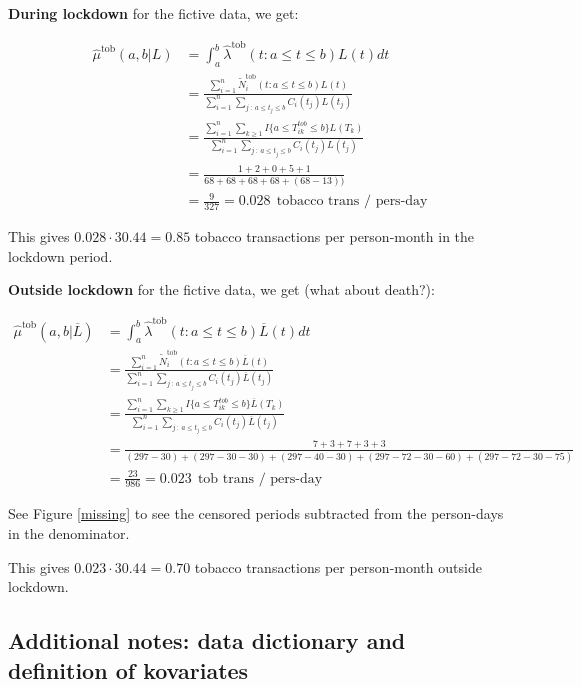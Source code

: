 \documentclass[
  11pt,
]{article}
\begin{document}
\textbf{During lockdown} for the fictive data, we get:

\begin{align*}
\hat{\mu}^{\text{tob}}(a, b | L) &= \int_a^b \hat{\lambda}^{\text{tob}} (t: a \leq t \leq b) L(t) dt \\
&=\frac{\sum_{i=1}^n \tilde{N}_i^{\text{tob}} (t: a \leq t \leq b) L(t)}{\sum_{i=1}^n \sum_{j \ : \ a \leq t_j \leq b} C_i(t_j) L(t_j)} \\
&=\frac{\sum_{i=1}^n \sum_{k \geq 1} I \{a \leq T^{tob}_{ik} \leq b\} L(T_k)}{\sum_{i=1}^n \sum_{j \ : \ a \leq t_j \leq b} C_i(t_j) L(t_j)} \\
&=\frac{1+2+0+5+1}{68+68+68+68+(68-13))} \\
&=\frac{9}{327} = 0.028 \ \ \text{tobacco trans / pers-day}
\end{align*}

This gives \(0.028 \cdot 30.44 = 0.85\) tobacco transactions per
person-month in the lockdown period.

\textbf{Outside lockdown} for the fictive data, we get (what about
death?):

\begin{align*}
\hat{\mu}^{\text{tob}}(a, b | \overline{L}) &= \int_a^b \hat{\lambda}^{\text{tob}} (t: a \leq t \leq b) \overline{L}(t) dt \\
&=\frac{\sum_{i=1}^n \tilde{N}_i^{\text{tob}} (t: a \leq t \leq b) \overline{L}(t)}{\sum_{i=1}^n \sum_{j \ : \ a \leq t_j \leq b} C_i(t_j) \overline{L}(t_j)} \\
&=\frac{\sum_{i=1}^n \sum_{k \geq 1} I \{a \leq T^{tob}_{ik} \leq b\} \overline{L}(T_k)}{\sum_{i=1}^n \sum_{j \ : \ a \leq t_j \leq b} C_i(t_j) \overline{L}(t_j)} \\
&=\frac{7+3+7+3+3}{(297-30)+(297-30-30)+(297-40-30)+(297-72-30-60)+(297-72-30-75)} \\
&=\frac{23}{986}=0.023 \ \ \text{tob trans / pers-day}
\end{align*}

See Figure \ref{missing} to see the censored periods subtracted from the
person-days in the denominator.

This gives \(0.023 \cdot 30.44 = 0.70\) tobacco transactions per
person-month outside lockdown.

\newpage

\hypertarget{additional-notes-data-dictionary-and-definition-of-kovariates}{%
\subsection{Additional notes: data dictionary and definition of
kovariates}\label{additional-notes-data-dictionary-and-definition-of-kovariates}}
\end{document}

